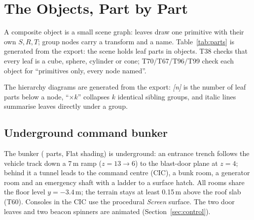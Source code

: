\section{The Objects, Part by Part}\label{sec:construction}
A composite object is a small scene graph: leaves draw one primitive with their own $S,R,T$; group nodes carry a transform and a name. Table~\ref{tab:parts} is
generated from the export: the scene holds \nLeaves{} leaf parts in \nObjects{} objects. T38 checks that every
leaf is a cube, sphere, cylinder or cone; T70/T67/T96/T99 check each object for ``primitives only, every node named''.

\begin{table}[h]
\centering\small
\caption{Parts per composite object, generated from . Depth is the deepest group
level. The \emph{Target Rover} row counts all three intruders (\partsRover{} parts each). }
\label{tab:parts}

\end{table}

\noindent The hierarchy diagrams are generated from the export: \emph{[n]} is the number of leaf
parts below a node, ``$\times k$'' collapses $k$ identical sibling groups, and italic lines summarise leaves directly under a group.

\begin{figure}[h]
\centering
{}
\caption{}
\end{figure}
\subsection{Underground command bunker}
The bunker (\partsBunker{} parts, Flat shading) is underground: an entrance trench follows the vehicle track down a 7\,m ramp
($z=13\to6$) to the blast-door plane at $z=4$; behind it a tunnel leads to the command centre (CIC), a bunk room, a generator room and an emergency shaft with a ladder to a surface
hatch. All rooms share the floor level $y=-3.4$\,m; the terrain stays at least 0.15\,m above the roof slab (T60). Consoles in the CIC use the procedural \emph{Screen} surface. The two door leaves and two beacon spinners are animated (Section~\ref{sec:control}).

